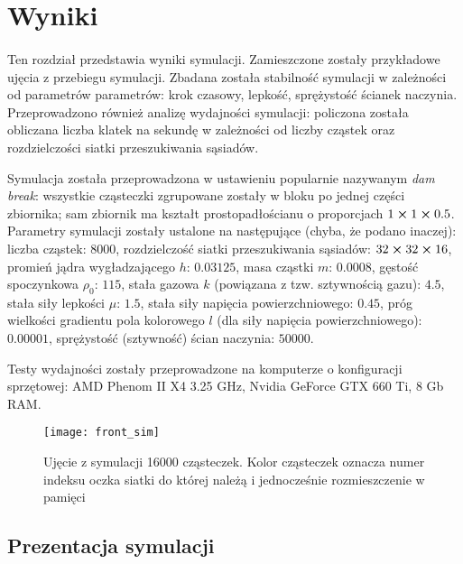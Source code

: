 \newpage

\section{Wyniki}

\paragraph{}
Ten rozdział przedstawia wyniki symulacji. Zamieszczone zostały przykładowe ujęcia z przebiegu symulacji. Zbadana została stabilność symulacji w zależności od parametrów parametrów: krok czasowy, lepkość, sprężystość ścianek naczynia. Przeprowadzono również analizę wydajności symulacji: policzona została obliczana liczba klatek na sekundę w zależności od liczby cząstek oraz rozdzielczości siatki przeszukiwania sąsiadów.

\par
Symulacja została przeprowadzona w ustawieniu popularnie nazywanym \textit{dam break}: wszystkie cząsteczki zgrupowane zostały w bloku po jednej części zbiornika; sam zbiornik ma kształt prostopadłościanu o proporcjach $1\cross1\cross0.5$. Parametry symulacji zostały ustalone na następujące (chyba, że podano inaczej): liczba cząstek: $8000$, rozdzielczość siatki przeszukiwania sąsiadów: $32\cross32\cross16$, promień jądra wygładzającego $h$: $0.03125$, masa cząstki $m$: $0.0008$, gęstość spoczynkowa $\rho_0$: $115$, stała gazowa $k$ (powiązana z tzw. sztywnością gazu): $4.5$, stała siły lepkości $\mu$: $1.5$, stała siły napięcia powierzchniowego: $0.45$, próg wielkości gradientu pola kolorowego $l$ (dla siły napięcia powierzchniowego): $0.00001$, sprężystość (sztywność) ścian naczynia: $50000$.
\par
Testy wydajności zostały przeprowadzone na komputerze o konfiguracji sprzętowej: AMD Phenom II X4 3.25 GHz, Nvidia GeForce GTX 660 Ti, 8 Gb RAM.
\par

\begin{figure}[H]
\centering
\texttt{[image: front\_sim]}
\caption{Ujęcie z symulacji 16000 cząsteczek. Kolor cząsteczek oznacza numer indeksu oczka siatki do której należą i jednocześnie rozmieszczenie w pamięci}
\label{fig:ss_front_sim}
\end{figure}

\par

\subsection{Prezentacja symulacji}
 
